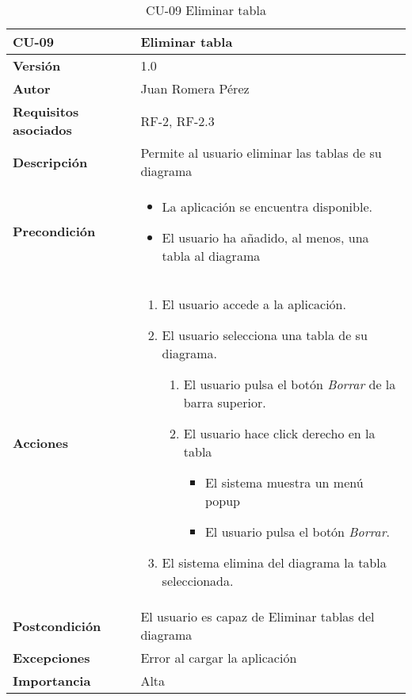 \begin{table}[p]
    \centering
    \begin{tabularx}{\linewidth}{ p{} p{}}
		\toprule
		\textbf{CU-09}    & \textbf{Eliminar tabla}\\
		\toprule
		\textbf{Versión}              & 1.0    \\
		\textbf{Autor}                & Juan Romera Pérez \\
		\textbf{Requisitos asociados} & RF-2, RF-2.3 \\
		\textbf{Descripción}          & Permite al usuario eliminar las tablas de su diagrama \\
		\textbf{Precondición}         & \begin{itemize}
		    \item La aplicación se encuentra disponible.
            \item El usuario ha añadido, al menos, una tabla al diagrama
		\end{itemize} \\
		\textbf{Acciones}             &
		\begin{enumerate}
			\def\labelenumi{\arabic{enumi}.}
			\tightlist
			\item El usuario accede a la aplicación.
			\item El usuario selecciona una tabla de su diagrama.
            \begin{enumerate}
                \item El usuario pulsa el botón \emph{Borrar} de la barra superior.
                \item El usuario hace click derecho en la tabla
                \begin{itemize}
                    \item El sistema muestra un menú popup
                    \item El usuario pulsa el botón \emph{Borrar}.
                \end{itemize}
            \end{enumerate}
            \item El sistema elimina del diagrama la tabla seleccionada.
		\end{enumerate}\\
		\textbf{Postcondición}        & El usuario es capaz de Eliminar tablas del diagrama \\
		\textbf{Excepciones}          & Error al cargar la aplicación \\
		\textbf{Importancia}          & Alta \\
		\bottomrule
    \end{tabularx}
    \caption{CU-09 Eliminar tabla}
\end{table}


